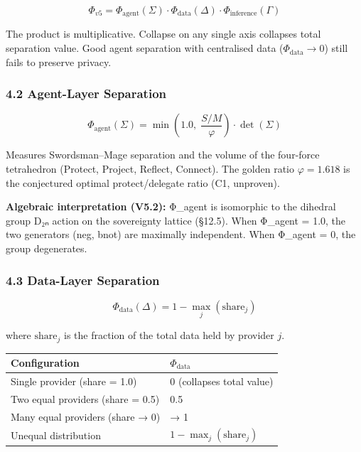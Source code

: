 \documentclass[
]{article}
\newcounter{none} %
\begin{document}
\[\Phi_{v5} = \Phi_{\text{agent}}(\Sigma) \cdot \Phi_{\text{data}}(\Delta) \cdot \Phi_{\text{inference}}(\Gamma)\]

The product is multiplicative. Collapse on any single axis collapses
total separation value. Good agent separation with centralised data
(\(\Phi_{\text{data}} \to 0\)) still fails to preserve privacy.

\subsubsection{4.2 Agent-Layer Separation}\label{agent-layer-separation}

\[\Phi_{\text{agent}}(\Sigma) = \min\!\left(1.0,\; \frac{S/M}{\varphi}\right) \cdot \det(\Sigma)\]

Measures Swordsman--Mage separation and the volume of the four-force
tetrahedron (Protect, Project, Reflect, Connect). The golden ratio
\(\varphi = 1.618\) is the conjectured optimal protect/delegate ratio
(C1, unproven).

\textbf{Algebraic interpretation (V5.2):} Φ\_agent is isomorphic to the
dihedral group D₂ₙ action on the sovereignty lattice (§12.5). When
Φ\_agent = 1.0, the two generators (neg, bnot) are maximally
independent. When Φ\_agent = 0, the group degenerates.

\subsubsection{4.3 Data-Layer Separation}\label{data-layer-separation}

\[\Phi_{\text{data}}(\Delta) = 1 - \max_j(\text{share}_j)\]

where \(\text{share}_j\) is the fraction of the total data held by
provider \(j\).

{\def\LTcaptype{none} %
\begin{longtable}[]{@{}ll@{}}
\toprule\noalign{}
Configuration & \(\Phi_{\text{data}}\) \\
\midrule\noalign{}
\endhead
\bottomrule\noalign{}
\endlastfoot
Single provider (share = 1.0) & 0 (collapses total value) \\
Two equal providers (share = 0.5) & 0.5 \\
Many equal providers (share → 0) & → 1 \\
Unequal distribution & \(1 - \max_j(\text{share}_j)\) \\
\end{longtable}
}
\end{document}
